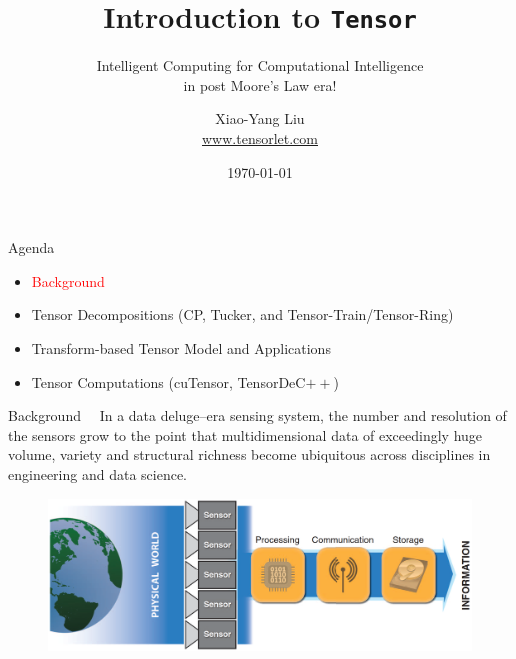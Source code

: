 \documentclass[t, 10pt, handout, aspectratio=169]{beamer}
\title[Introduction to Tensor]{Introduction to \texttt{Tensor}}
\subtitle{Intelligent Computing for Computational Intelligence \\
in post Moore’s Law era!}
\author[yanglet]{Xiao-Yang Liu\\
\url{www.tensorlet.com}}
\institute[CU]{Columbia University}
\date[\number\month/\number\day/\number\year]{\today}
\begin{document}
\begin{frame}
  \titlepage
\end{frame}

\begin{frame}{Agenda}
\begin{itemize}
    \large \item \textcolor{red}{Background}
    \large \item {Tensor Decompositions (CP, Tucker, and Tensor-Train/Tensor-Ring)}
    \large \item{Transform-based Tensor Model and Applications}
    \large \item{Tensor Computations (cuTensor, TensorDeC$++$)}
\end{itemize}
\end{frame}

\begin{frame}{Background}
~~In a data deluge–era sensing system, the number and resolution of the sensors grow to the point that multidimensional data of exceedingly huge volume, variety and structural richness become ubiquitous across disciplines in engineering and data science.
\begin{figure}
	\centering  
	\includegraphics[width=\linewidth]{figs/data_deluge.png}
	\label{fig:data_deluge}
\end{figure}
\end{frame}
\end{document}
